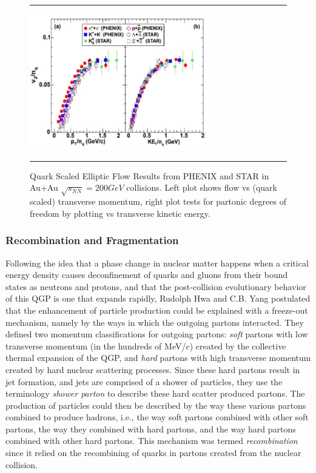 \begin{figure}[htbp!]
  \centering    \rule{35em}{0.5pt}
    \includegraphics[width=0.7\textwidth]{prevplots/quarkscaledv2.JPG}

  \caption[Quark Scaled Elliptic Flow Results from PHENIX and STAR in Au+Au $\sqrt{s_NN}=200 GeV$ collisions]{Quark Scaled Elliptic Flow Results from PHENIX and STAR\citep{velkovska:lec12} in Au+Au $\sqrt{s_{NN}}=200 GeV$ collisions. Left plot shows flow vs (quark scaled) transverse momentum, right plot tests for partonic degrees of freedom by plotting vs transverse kinetic energy.}
  \label{fig:quarkscaledv2}    \rule{35em}{0.5pt}
\end{figure} 

\subsubsection{Recombination and Fragmentation}
Following the idea that a phase change in nuclear matter happens when a critical energy density causes deconfinement of quarks and gluons from their bound states as neutrons and protons, and that the post-collision evolutionary behavior of this QGP is one that expands rapidly, Rudolph Hwa and C.B. Yang postulated that the enhancement of particle production could be explained with a freeze-out mechanism, namely by the ways in which the outgoing partons interacted\citep{PhysRevC.70.024905}. They defined two momentum classifications for outgoing partons: \textit{soft} partons with low transverse momentum (in the hundreds of MeV/c) created by the collective thermal expansion of the QGP, and \textit{hard} partons with high transverse momentum created by hard nuclear scattering processes. Since these hard partons result in jet formation, and jets are comprised of a shower of particles, they use the terminology \textit{shower parton} to describe these hard scatter produced partons. The production of particles could then be described by the way these various partons combined to produce hadrons, i.e., the way soft partons combined with other soft partons, the way they combined with hard partons, and the way hard partons combined with other hard partons. This mechanism was termed \textit{recombination} since it relied on the recombining of quarks in partons created from the nuclear collision.

